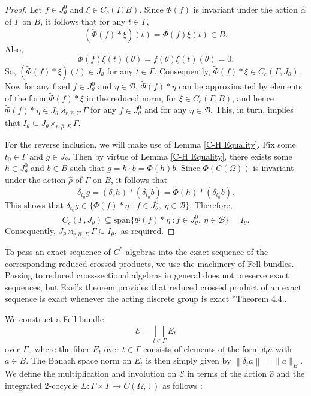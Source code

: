 \documentclass[a4paper,11pt,reqno]{amsart}
\theoremstyle{plain}
\theoremstyle{mainthmstyle}
\theoremstyle{named}
\numberwithin{equation}{section}
\begin{document}
\begin{proof}
Let $f \in J_{\theta}^{0}$ and $\xi \in C_c (\Gamma, B)$. Since $\Phi (f)$ is invariant under the action $\hat {\alpha}$ of $\Gamma$ on $B$, it follows that for any $t \in \Gamma$,
$$(\tilde {\Phi} (f) * \xi) (t) = \Phi (f) \xi (t) \in B.$$
Also,
$$\Phi (f) \xi (t) (\theta) = f (\theta) \xi (t) (\theta) = 0.$$
So, $(\tilde {\Phi} (f) * \xi) (t) \in J_{\theta}$ for any $t \in \Gamma$. Consequently, $\tilde {\Phi} (f) * \xi \in C_c (\Gamma, J_{\theta})$. Now for any fixed $f \in J_{\theta}^{0}$ and $\eta \in \mathcal B$, $\tilde{\Phi} (f) * \eta$ can be approximated by elements of the form $\tilde {\Phi} (f) * \xi$ in the reduced norm, for $\xi \in C_c (\Gamma, B)$, and hence $\tilde {\Phi} (f) * \eta \in J_{\theta} \rtimes_{r, \hat {\rho}, \Sigma} \Gamma$ for any $f \in J_{\theta}^{0}$ and for any $\eta \in \mathcal B$. This, in turn, implies that $I_{\theta} \subseteq J_{\theta} \rtimes_{r, \hat {\rho}, \Sigma} \Gamma$.

\vspace{2mm}

For the reverse inclusion, we will make use of Lemma \ref{C-H Equality}. Fix some $t_0 \in \Gamma$ and $g \in J_{\theta}$. Then by virtue of Lemma \ref{C-H Equality}, there exists some $h \in J_{\theta}^{0}$ and $b \in B$ such that $g = h \cdot b = \Phi (h) b$. Since $\Phi (C (\Omega))$ is invariant under the action $\hat {\rho}$ of $\Gamma$ on $B$, it follows that
$$\delta_{t_0} g = (\delta_e h) * (\delta_{t_0} b) = \tilde {\Phi} (h) * (\delta_{t_0} b).$$
This shows that $\delta_{t_0} g \in \{\tilde{\Phi} (f) * \eta\ :\ f \in J_{\theta}^{0},\ \eta \in \mathcal B\}$. Therefore, 
$$C_c (\Gamma, J_{\theta}) \subseteq \overline{\mathrm {span} \{\tilde {\Phi} (f) * \eta\ : f \in J_{\theta}^{0},\ \eta \in \mathcal {B}\}} = I_{\theta}.$$ 
Consequently, $J_{\theta} \rtimes_{r, \hat {\alpha}, \Sigma} \Gamma \subseteq I_{\theta},$ as required.
\end{proof}

To pass an exact sequence of $C^{\ast}$-algebras into the exact sequence of the corresponding reduced crossed products, we use the machinery of Fell bundles. Passing to reduced cross-sectional algebras in general does not preserve exact sequences, but Exel’s theorem provides that reduced crossed product of an exact sequence is exact whenever the acting discrete group is exact \cite{Exel-Exact}*{Theorem 4.4.}.

We construct a Fell bundle $$\mathcal{E} = \bigsqcup\limits_{t \in \Gamma} E_t$$ over $\Gamma,$ where the fiber $E_t$ over $t \in \Gamma$ consists of elements of the form $\delta_t a$ with $a \in B.$ The Banach space norm on $E_t$ is then simply given by $\left \|\delta_t a \right \| = \|a\|_B.$
We define the multiplication and involution on $\mathcal{E}$ in terms of the action $\hat{\rho}$ and the integrated $2$-cocycle $\Sigma : \Gamma \times \Gamma \to C(\Omega, \mathbb{T})$ as follows $:$
\end{document}
